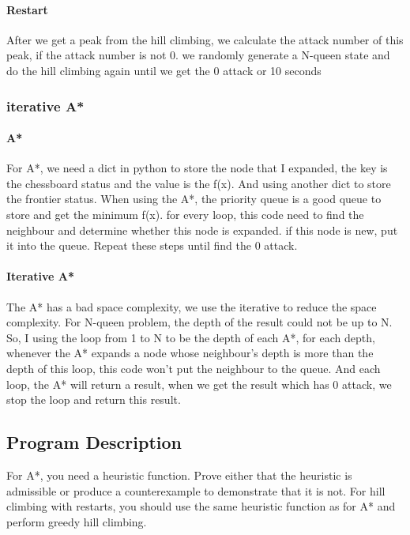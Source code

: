 \documentclass[11pt, a4paper]{article}
\begin{document}
\paragraph{Restart}
After we get a peak from the hill climbing, we calculate the attack number of this peak, if the attack number is not 0. we randomly generate a N-queen state and do the hill climbing again until we get the 0 attack or 10 seconds


\subsubsection{iterative A*}
\paragraph{A*}
For A*, we need a dict in python to store the node that I expanded, the key is the chessboard status and the value is the f(x). And using another dict to store the frontier status. When using the A*, the priority queue is a good queue to store and get the minimum f(x). 
for every loop, this code need to find the neighbour and determine whether this node is expanded. if this node is new, put it into the queue. Repeat these steps until find the 0 attack. 

\paragraph{Iterative A*}
The A* has a bad space complexity, we use the iterative to reduce the space complexity. For N-queen problem, the depth of the result could not be up to N. So, I using the loop from 1 to N to be the depth of each A*, for each depth, whenever the A* expands a node whose neighbour's depth is more than the depth of this loop, this code won’t put the neighbour to the queue. And each loop, the A* will return a result, when we get the result which has 0 attack, we stop the loop and return this result. 

\subsection{Program Description}

For A*, you need a heuristic function. Prove either that the heuristic is admissible or produce a counterexample to demonstrate that it is not. For hill climbing with restarts, you should use the same heuristic function as for A* and perform greedy hill climbing. 
\end{document}
